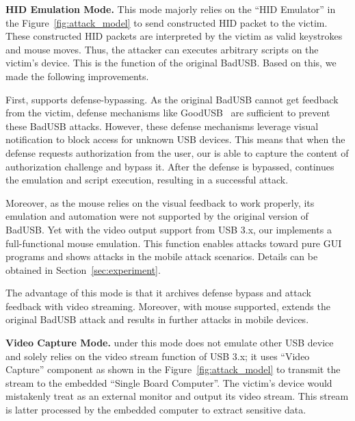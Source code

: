 \textbf{HID Emulation Mode.} This mode majorly relies on the ``HID Emulator'' in the Figure~\ref{fig:attack_model} to
send constructed HID packet to the victim. These constructed HID packets are
interpreted by the victim as valid keystrokes and mouse moves. Thus, the
attacker can executes arbitrary scripts on the victim's device. This is the
function of the original BadUSB. Based on this, we made the following
improvements.

First, \tool supports defense-bypassing. As the original BadUSB cannot get
feedback from the victim, defense mechanisms like GoodUSB~\cite{tian2015defending} are sufficient to prevent these BadUSB attacks.
However, these defense mechanisms leverage visual notification to block access
for unknown USB devices. This means that when the defense requests authorization
from the user, our \tool is able to capture the content of authorization
challenge and bypass it. After the defense is bypassed, \tool continues the
emulation and script execution, resulting in a successful attack.

Moreover, as the mouse relies on the visual feedback to work properly, its
emulation and automation were not supported by the original version of BadUSB.
Yet with the video output support from USB 3.x, our \tool implements a
full-functional mouse emulation. This function enables attacks toward pure GUI
programs and shows attacks in the mobile attack scenarios. Details can
be obtained in Section~\ref{sec:experiment}.

The advantage of this mode is that it archives defense bypass and attack
feedback with video streaming.  
Moreover, with mouse
supported, \tool extends the original BadUSB attack and results in further attacks in
mobile devices.

\textbf{Video Capture Mode.} \tool under this mode does not emulate other
USB device and solely relies on the video stream function of USB 3.x; it uses
``Video Capture'' component as shown in the Figure~\ref{fig:attack_model} to transmit the stream to the embedded ``Single Board Computer''.
The victim's device would mistakenly treat \tool as an external monitor
and output its video stream. This stream is latter processed by the embedded
computer to extract sensitive data.

